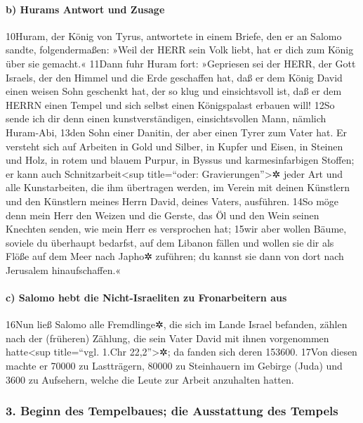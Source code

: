 \hypertarget{b-hurams-antwort-und-zusage}{%
\paragraph{b) Hurams Antwort und
Zusage}\label{b-hurams-antwort-und-zusage}}

10Huram, der König von Tyrus, antwortete in einem Briefe, den er an
Salomo sandte, folgendermaßen: »Weil der HERR sein Volk liebt, hat er
dich zum König über sie gemacht.« 11Dann fuhr Huram fort: »Gepriesen sei
der HERR, der Gott Israels, der den Himmel und die Erde geschaffen hat,
daß er dem König David einen weisen Sohn geschenkt hat, der so klug und
einsichtsvoll ist, daß er dem HERRN einen Tempel und sich selbst einen
Königspalast erbauen will! 12So sende ich dir denn einen
kunstverständigen, einsichtsvollen Mann, nämlich Huram-Abi, 13den Sohn
einer Danitin, der aber einen Tyrer zum Vater hat. Er versteht sich auf
Arbeiten in Gold und Silber, in Kupfer und Eisen, in Steinen und Holz,
in rotem und blauem Purpur, in Byssus und karmesinfarbigen Stoffen; er
kann auch Schnitzarbeit\textless sup title=``oder:
Gravierungen''\textgreater✲ jeder Art und alle Kunstarbeiten, die ihm
übertragen werden, im Verein mit deinen Künstlern und den Künstlern
meines Herrn David, deines Vaters, ausführen. 14So möge denn mein Herr
den Weizen und die Gerste, das Öl und den Wein seinen Knechten senden,
wie mein Herr es versprochen hat; 15wir aber wollen Bäume, soviele du
überhaupt bedarfst, auf dem Libanon fällen und wollen sie dir als Flöße
auf dem Meer nach Japho✲ zuführen; du kannst sie dann von dort nach
Jerusalem hinaufschaffen.«

\hypertarget{c-salomo-hebt-die-nicht-israeliten-zu-fronarbeitern-aus}{%
\paragraph{c) Salomo hebt die Nicht-Israeliten zu Fronarbeitern
aus}\label{c-salomo-hebt-die-nicht-israeliten-zu-fronarbeitern-aus}}

16Nun ließ Salomo alle Fremdlinge✲, die sich im Lande Israel befanden,
zählen nach der (früheren) Zählung, die sein Vater David mit ihnen
vorgenommen hatte\textless sup title=``vgl. 1.Chr 22,2''\textgreater✲;
da fanden sich deren 153600. 17Von diesen machte er 70000 zu
Lastträgern, 80000 zu Steinhauern im Gebirge (Juda) und 3600 zu
Aufsehern, welche die Leute zur Arbeit anzuhalten hatten.

\hypertarget{beginn-des-tempelbaues-die-ausstattung-des-tempels}{%
\subsubsection{3. Beginn des Tempelbaues; die Ausstattung des
Tempels}\label{beginn-des-tempelbaues-die-ausstattung-des-tempels}}

